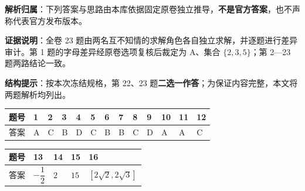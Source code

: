 
\begin{gknotice}
\textbf{解析归属}：下列答案与思路由本库依据固定原卷独立推导，\textbf{不是官方答案}，也不声称代表官方发布版本。

\textbf{证据说明}：全卷 23 题由两名互不知情的求解角色各自独立求解，并逐题进行差异审计。第 1 题的字母差异经原卷选项复核后裁定为 A、集合 $\{2,3,5\}$；第 2—23 题两路结论一致。

\textbf{结构提示}：按本次冻结规格，第 22、23 题\textbf{二选一作答}；为保证内容完整，本文将两题解析均列出。
\end{gknotice}


\begin{center}
\begingroup\setlength{\tabcolsep}{4pt}
\begin{tabular}{lllllllllllll}
\toprule
题号 & 1 & 2 & 3 & 4 & 5 & 6 & 7 & 8 & 9 & 10 & 11 & 12 \\
\midrule
答案 & A & C & B & D & C & B & B & C & D & A & A & C \\
\bottomrule
\end{tabular}
\endgroup
\end{center}

\begin{center}
\begin{tabular}{lllll}
\toprule
题号 & 13 & 14 & 15 & 16 \\
\midrule
答案 & $-\dfrac12$ & $2$ & $15$ & $[2\sqrt2,2\sqrt3]$ \\
\bottomrule
\end{tabular}
\end{center}

\par\medskip



